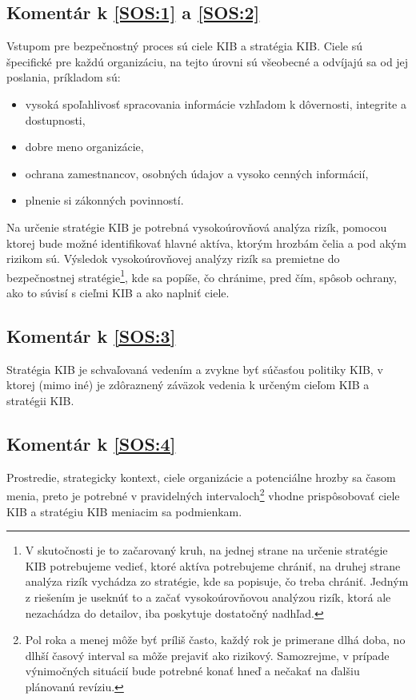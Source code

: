 
\subsection*{Komentár k \ref{SOS:1} a \ref{SOS:2}}
Vstupom pre bezpečnostný proces sú ciele KIB a stratégia KIB. Ciele sú špecifické pre každú organizáciu, na tejto úrovni
sú všeobecné a odvíjajú sa od jej poslania, príkladom sú:
\begin{itemize}
  \item vysoká spoľahlivosť spracovania informácie vzhľadom k dôvernosti, integrite a dostupnosti,
  \item dobre meno organizácie,
  \item ochrana zamestnancov, osobných údajov a vysoko cenných informácií,
  \item plnenie si zákonných povinností.
\end{itemize}

Na určenie stratégie KIB je potrebná vysokoúrovňová analýza rizík, pomocou ktorej bude možné identifikovať hlavné aktíva,
ktorým hrozbám čelia a pod akým rizikom sú. Výsledok vysokoúrovňovej analýzy rizík sa premietne do bezpečnostnej stratégie\footnote{
V skutočnosti je to začarovaný kruh, na jednej strane na určenie stratégie KIB potrebujeme vedieť, ktoré aktíva
potrebujeme chrániť, na druhej strane analýza rizík vychádza zo stratégie, kde sa popisuje, čo treba chrániť. Jedným z 
riešením je useknúť to a začať vysokoúrovňovou analýzou rizík, ktorá ale nezachádza do detailov, iba poskytuje dostatočný
nadhľad.}, kde sa popíše, čo chránime, pred čím, spôsob ochrany, ako to súvisí s cieľmi KIB a ako naplniť ciele.

\subsection*{Komentár k \ref{SOS:3}}
Stratégia KIB je schvaľovaná vedením a zvykne byť súčasťou politiky KIB, v ktorej (mimo iné) je zdôraznený záväzok vedenia
k určeným cieľom KIB a stratégii KIB.

\subsection*{Komentár k \ref{SOS:4}}
Prostredie, strategicky kontext, ciele organizácie a potenciálne hrozby sa časom menia, preto je potrebné v pravidelných
intervaloch\footnote{Pol roka a menej môže byť príliš často, každý rok je primerane dlhá doba, no dlhší časový interval
sa môže prejaviť ako rizikový. Samozrejme, v prípade výnimočných situácií bude potrebné konať hneď a nečakať na ďalšiu
plánovanú revíziu.} vhodne prispôsobovať ciele KIB a stratégiu KIB meniacim sa podmienkam.


